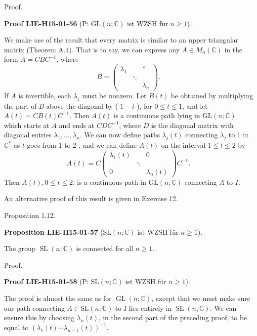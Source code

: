 \documentclass[10pt, letterpaper]{article}
\newcommand{\C}{\mathbb{C}}
\newcommand{\GL}{\mathrm{GL}}
\newcommand{\SL}{\mathrm{SL}}
\newcommand{\CustomHeading}[3]{%
  \par\medskip\noindent%
  \textbf{#1 #2} \textnormal{(#3)}.\enskip%
}
\newenvironment{PROP}[2]{\begin{unitbox}\CustomHeading{Proposition}{#1}{#2}}{\end{unitbox}}
\newenvironment{PROOF}[2]{\begin{unitbox}\CustomHeading{Proof}{#1}{#2}}{\end{unitbox}}
\begin{document}
Proof. 

\begin{PROOF}{LIE-H15-01-56}{P: $\GL(n;\C)$ ist WZSH für $n\geq 1$}
We make use of the result that every matrix is similar to an upper triangular matrix (Theorem A.4). That is to say, we can express any $A \in M_{n}(\mathbb{C})$ in the form $A=C B C^{-1}$, where
$$
B=\left(\begin{array}{lll}
\lambda_{1} & & * \\
& \ddots & \\
& & \lambda_{n}
\end{array}\right) .
$$
If $A$ is invertible, each $\lambda_{j}$ must be nonzero. Let $B(t)$ be obtained by multiplying the part of $B$ above the diagonal by ( $1-t$ ), for $0 \leq t \leq 1$, and let $A(t)=C B(t) C^{-1}$. Then $A(t)$ is a continuous path lying in $\mathrm{GL}(n ; \mathbb{C})$ which starts at $A$ and ends at $C D C^{-1}$, where $D$ is the diagonal matrix with diagonal entries $\lambda_{1}, \ldots, \lambda_{n}$. We can now define paths $\lambda_{j}(t)$ connecting $\lambda_{j}$ to 1 in $\mathbb{C}^{*}$ as $t$ goes from 1 to 2 , and we can define $A(t)$ on the interval $1 \leq t \leq 2$ by
$$
A(t)=C\left(\begin{array}{ccc}
\lambda_{1}(t) & & 0 \\
& \ddots & \\
0 & & \lambda_{n}(t)
\end{array}\right) C^{-1} .
$$
Then $A(t), 0 \leq t \leq 2$, is a continuous path in $\mathrm{GL}(n ; \mathbb{C})$ connecting $A$ to $I$.
\end{PROOF}


An alternative proof of this result is given in Exercise 12.



Proposition 1.12. 

\begin{PROP}{LIE-H15-01-57}{$\SL(n;\C)$ ist WZSH für $n\geq 1$}
The group $\operatorname{SL}(n ; \mathbb{C})$ is connected for all $n \geq 1$.
\end{PROP}


Proof. 


\begin{PROOF}{LIE-H15-01-58}{P: $\SL(n;\C)$ ist WZSH für $n\geq 1$}
The proof is almost the same as for $\operatorname{GL}(n ; \mathbb{C})$, except that we must make sure our path connecting $A \in \mathrm{SL}(n ; \mathbb{C})$ to $I$ lies entirely in $\operatorname{SL}(n ; \mathbb{C})$. We can ensure this by choosing $\lambda_{n}(t)$, in the second part of the preceding proof, to be equal to $\left(\lambda_{1}(t) \cdots \lambda_{n-1}(t)\right)^{-1}$.
\end{PROOF}
\end{document}
